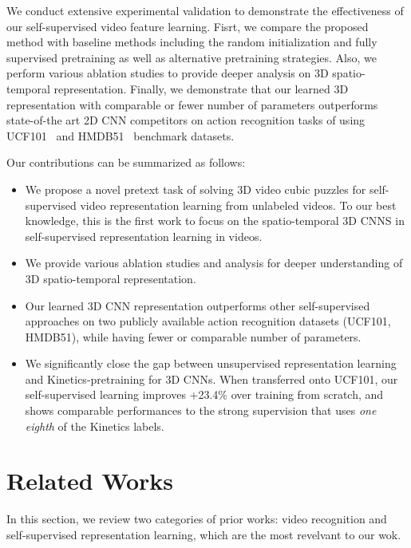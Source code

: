 \documentclass[letterpaper]{article} \usepackage{aaai19}  \usepackage{times}  \usepackage{helvet}  \usepackage{courier}  \usepackage{url}  \usepackage{graphicx}  \frenchspacing  \setlength{\pdfpagewidth}{8.5in}  \setlength{\pdfpageheight}{11in}
\begin{document}
We conduct extensive experimental validation to demonstrate the effectiveness of our self-supervised video feature learning.  Fisrt, we compare the proposed method with baseline methods including the random initialization and fully supervised pretraining as well as alternative pretraining strategies. Also, we perform various ablation studies to provide deeper analysis on 3D spatio-temporal representation. Finally, we demonstrate that our learned 3D representation with comparable or fewer number of parameters outperforms state-of-the art 2D CNN competitors on action recognition tasks of using UCF101~\cite{UCF101} and HMDB51~\cite{HMDB51} benchmark datasets.

Our contributions can be summarized as follows:
\begin{itemize}
\item We propose a novel pretext task of solving 3D video cubic puzzles for self-supervised video representation learning from unlabeled videos. To our best knowledge, this is the first work to focus on the spatio-temporal 3D CNNS in self-supervised representation learning in videos.


\item We provide various ablation studies and analysis for deeper understanding of 3D spatio-temporal representation.

\item Our learned 3D CNN representation outperforms other self-supervised approaches on two publicly available action recognition datasets (UCF101, HMDB51), while having fewer or comparable number of parameters.

\item We significantly close the gap between unsupervised representation learning and Kinetics-pretraining for 3D CNNs. When transferred onto UCF101, our self-supervised learning improves +23.4\% over training from scratch, and shows comparable performances to the strong supervision that uses \textit{one eighth} of the Kinetics labels. 

\end{itemize}



\section{Related Works}
In this section, we review two categories of prior works: video recognition and self-supervised representation learning,  which are the most revelvant to our wok.
\end{document}
